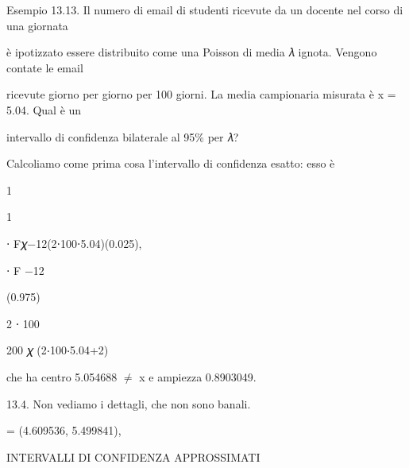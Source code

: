 \documentclass[a4paper,portrait,12pt]{article}
\begin{document}
\begin{flushleft}
Esempio 13.13. Il numero di email di studenti ricevute da un docente nel corso di una giornata
\end{flushleft}


\begin{flushleft}
\`{e} ipotizzato essere distribuito come una Poisson di media 𝜆 ignota. Vengono contate le email
\end{flushleft}


\begin{flushleft}
ricevute giorno per giorno per 100 giorni. La media campionaria misurata \`{e} x = 5.04. Qual \`{e} un
\end{flushleft}


\begin{flushleft}
intervallo di confidenza bilaterale al 95\% per 𝜆?
\end{flushleft}


\begin{flushleft}
Calcoliamo come prima cosa l'intervallo di confidenza esatto: esso \`{e}
\end{flushleft}


1


1


\begin{flushleft}
⋅ F𝜒$-$12(2⋅100⋅5.04)(0.025),
\end{flushleft}


\begin{flushleft}
⋅ F $-$12
\end{flushleft}


(0.975)


2 ⋅ 100


\begin{flushleft}
200 𝜒 (2⋅100⋅5.04+2)
\end{flushleft}


\begin{flushleft}
che ha centro 5.054688 $\neq$ x e ampiezza 0.8903049.
\end{flushleft}


\begin{flushleft}
13.4. Non vediamo i dettagli, che non sono banali.
\end{flushleft}





= (4.609536, 5.499841),





\begin{flushleft}
 INTERVALLI DI CONFIDENZA APPROSSIMATI
\end{flushleft}
\end{document}
